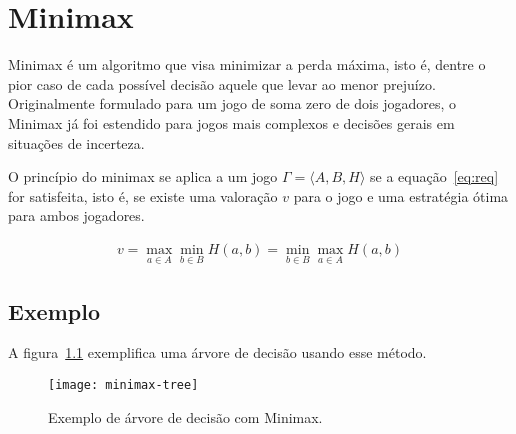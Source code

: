 \chapter{Minimax}\label{cap:minimax}

Minimax é um algoritmo que visa minimizar a perda máxima, isto é, dentre
o pior caso de cada possível decisão aquele que levar ao menor prejuízo.
Originalmente formulado para um jogo de soma zero de dois jogadores, o Minimax
já foi estendido para jogos mais complexos e decisões gerais em situações de
incerteza.

O princípio do minimax se aplica a um jogo $\Gamma=\langle A,B,H\rangle$ se a
equação~\ref{eq:req} for satisfeita, isto é, se existe uma valoração $v$ para o
jogo e uma estratégia ótima para ambos jogadores.
\cite{hazewinkel2002encyclopaedia}

\begin{gather}
  v=\max_{a\in A}\min_{b\in B}H(a,b)=\min_{b\in B}\max_{a\in A}H(a,b)\label{eq:req}
\end{gather}

\section{Exemplo}

A figura~\ref{fig:minimax-tree} exemplifica uma árvore de decisão usando esse
método.

\begin{figure}[ht]
  \centering
  \texttt{[image: minimax-tree]}
  \caption{Exemplo de árvore de decisão com Minimax.}\label{fig:minimax-tree}
\end{figure}


